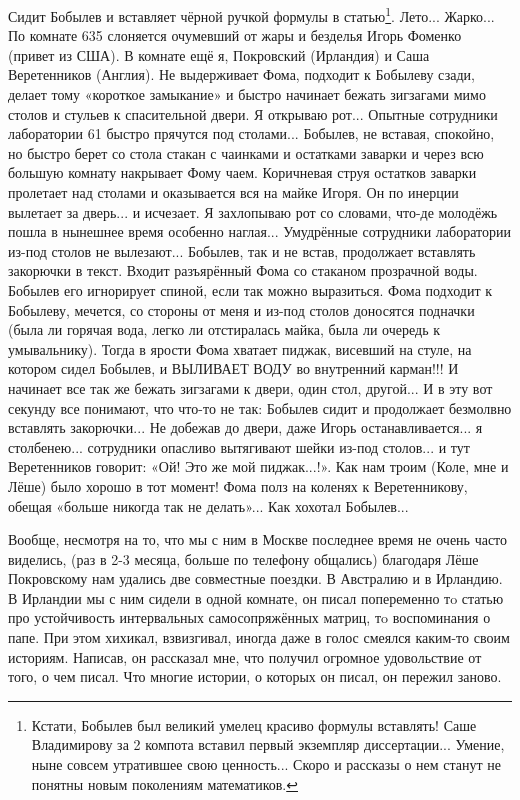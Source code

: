 Сидит Бобылев и вставляет чёрной ручкой формулы в статью\footnote{Кстати, Бобылев был великий умелец красиво формулы вставлять! Саше Владимирову за 2 компота вставил первый экземпляр диссертации... Умение, ныне совсем утратившее свою ценность... Скоро и рассказы о нем станут не понятны новым поколениям математиков.}. Лето... Жарко...
По комнате 635 слоняется очумевший от жары и безделья Игорь Фоменко (привет из США).
В комнате ещё я, Покровский (Ирландия) и Саша Веретенников (Англия). Не выдерживает Фома, подходит к Бобылеву сзади, делает тому «короткое замыкание» и быстро начинает бежать зигзагами мимо столов и стульев к спасительной двери. Я открываю рот... Опытные сотрудники лаборатории 61 быстро прячутся под столами... Бобылев, не вставая, спокойно, но быстро берет со стола стакан с чаинками и остатками заварки и через всю большую комнату накрывает Фому чаем. Коричневая струя остатков заварки пролетает над столами и оказывается вся на майке Игоря. Он по инерции вылетает за дверь... и исчезает. Я захлопываю рот со словами, что-де молодёжь пошла в нынешнее время особенно наглая... Умудрённые сотрудники лаборатории из-под столов не вылезают... Бобылев, так и не встав, продолжает вставлять закорючки в текст. Входит разъярённый Фома со стаканом прозрачной воды. Бобылев его игнорирует спиной, если так можно выразиться. Фома подходит к Бобылеву, мечется, со стороны от меня и из-под столов доносятся подначки (была ли горячая вода, легко ли отстиралась майка, была ли очередь к умывальнику). Тогда в ярости Фома хватает пиджак, висевший на стуле, на котором сидел Бобылев, и ВЫЛИВАЕТ ВОДУ во внутренний карман!!! И начинает все так же бежать зигзагами к двери, один стол, другой... И в эту вот секунду все понимают, что что-то не так: Бобылев сидит и продолжает безмолвно вставлять закорючки... Не добежав до двери, даже Игорь останавливается... я столбенею... сотрудники опасливо вытягивают шейки из-под столов... и тут Веретенников говорит: «Ой! Это же мой пиджак...!». Как нам троим (Коле, мне и Лёше) было хорошо в тот момент! Фома полз на коленях к Веретенникову, обещая «больше никогда так не делать»... Как хохотал Бобылев...

Вообще, несмотря на то, что мы с ним в Москве последнее время не очень часто виделись, (раз в 2-3 месяца, больше по телефону общались) благодаря Лёше Покровскому нам удались две совместные поездки. В Австралию и в Ирландию. В Ирландии мы с ним сидели в одной комнате, он писал попеременно тo статью про устойчивость интервальных самосопряжённых матриц, тo воспоминания о папе. При этом хихикал, взвизгивал, иногда даже в голос смеялся каким-то своим историям. Написав, он рассказал мне, что получил огромное удовольствие от того, о чем писал. Что многие истории, о которых он писал, он пережил заново.

